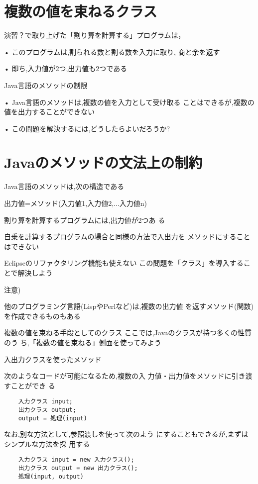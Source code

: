\documentclass[a4j,papersize]{jsbook}
\begin{document}
\section{複数の値を束ねるクラス}
演習？で取り上げた「割り算を計算する」プログラムは，

• このプログラムは,割られる数と割る数を入力に取り,
商と余を返す

• 即ち,入力値が2つ,出力値も2つである

Java言語のメソッドの制限

• Java言語のメソッドは,複数の値を入力として受け取る
ことはできるが,複数の値を出力することができない

• この問題を解決するには,どうしたらよいだろうか?

\section{Javaのメソッドの文法上の制約}

Java言語のメソッドは,次の構造である

 出力値=メソッド(入力値1,入力値2,...入力値n)

割り算を計算するプログラムには,出力値が2つあ
る

 自乗を計算するプログラムの場合と同様の方法で入出力を
メソッドにすることはできない

 Eclipseのリファクタリング機能も使えない
この問題を「クラス」を導入することで解決しよう

 注意)

 他のプログラミング言語(LispやPerlなど)は,複数の出力値
を返すメソッド(関数)を作成できるものもある

複数の値を束ねる手段としてのクラス
ここでは,Javaのクラスが持つ多くの性質のう
ち,「複数の値を束ねる」側面を使ってみよう

入出力クラスを使ったメソッド

次のようなコードが可能になるため,複数の入
力値・出力値をメソッドに引き渡すことができ
る

\begin{verbatim}
	入力クラス input;
	出力クラス output;
	output = 処理(input)
\end{verbatim}

なお,別な方法として,参照渡しを使って次のよう
にすることもできるが,まずはシンプルな方法を採
用する

\begin{verbatim}
	入力クラス input = new 入力クラス();
	出力クラス output = new 出力クラス();
	処理(input, output)
\end{verbatim}
\end{document}
